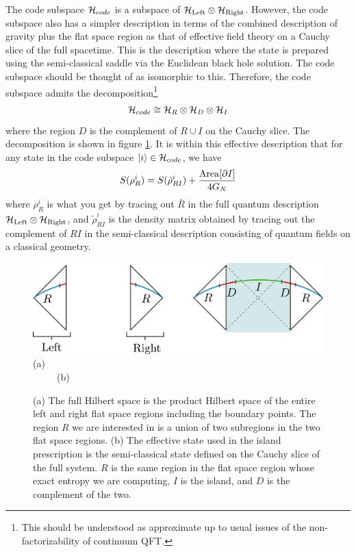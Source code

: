 The code subspace ${\cal H}_{code}$ is a subspace of $ {\cal H}_{\rm Left} \otimes {\cal H}_{\rm Right}$. However, the code subspace also has a simpler description in terms of the combined description of gravity plus the flat space region as that of effective field theory on a Cauchy slice of the full spacetime. This is the description where the state is prepared using the semi-classical saddle via the Euclidean black hole solution. 
The code subspace should be thought of as isomorphic to this. Therefore, the code subspace admits the decomposition\footnote{This should be understood as approximate up to usual issues of the non-factorizability of continuum QFT.}
\begin{align}
{\cal H}_{code} \cong {\cal H}_{R} \otimes {\cal H}_{D} \otimes {\cal H}_{I} 
\end{align}
where the region $D$ is the complement of $R \cup I$ on the Cauchy slice. The decomposition is shown in figure \ref{JLMSlatetime}. It is within this effective description that for any state in the code subspace $|i \rangle \in {\cal H}_{code}$, we have
\begin{align}
S({\bold \rho}_{R}^{i}) = S(\tilde{\rho}_{RI}^{i}) + {\mathrm{Area}[\partial I] \over 4 G_N}
\end{align}
where $\rho^i_{R}$ is what you get by tracing out $\bar{R}$ in the full quantum description ${\cal H}_{\rm Left} \otimes {\cal H}_{\rm Right}$, and $\tilde{\rho}_{RI}^i$ is the density matrix obtained by tracing out the complement of $RI$ in the semi-classical description consisting of quantum fields on a classical geometry.

\begin{figure}
\begin{center}
\includegraphics[scale=0.6]{figures/JLMSlatetime.jpg}
(a) ~~~~~~~~~~~~~~~~~~~~~~~~~~~~~~~~~~~~~~~~~~~~~~~~~~~~~~~ ~~~~~(b)
\end{center}
\caption{\small (a) The full Hilbert space is the product Hilbert space of the entire left and right flat space regions including the boundary points. The region $R$ we are interested in is a union of two subregions in the two flat space regions. (b) The effective state used in the island prescription is the semi-classical state defined on the Cauchy slice of the full system. $R$ is the same region in the flat space region whose exact entropy we are computing, $I$ is the island, and $D$ is the complement of the two.
\label{JLMSlatetime}}
\end{figure}

